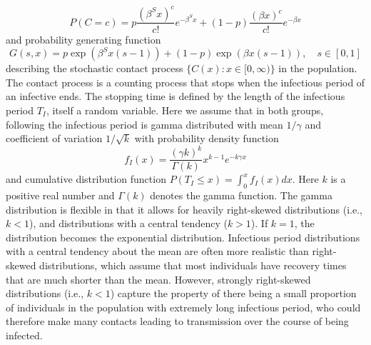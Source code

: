 \documentclass{imammb}
\numberwithin{equation}{section}
\begin{document}
\begin{equation}\label{eqn:contactpmf}
  P(C=c)=  p \frac{(\beta^S x)^c}{c!} e^{-\beta^S x} +(1-p)\frac{(\beta x)^c }{c!} e^{-\beta x}
\end{equation}
and probability generating function
\begin{equation}\label{eqn:contactpgf}
    G(s,x) = p \exp \left ( \beta^S x (s-1) \right)  + (1-p) \exp  \left (\beta x (s-1)\right), \quad s \in [0,1]
\end{equation}
describing the stochastic contact process $\{C(x): x \in [0, \infty)\}$ in the population. The contact process is a counting process that stops when the infectious period of an infective ends. The stopping time is defined by the length of the infectious period $T_I$, itself a random variable. Here we assume that in both groups, following \citet{Anderson, Britton} the infectious period is gamma distributed with mean $1/\gamma$ and coefficient of variation $1/\sqrt{k}$ with probability density function
\begin{equation}\label{eqn:gammapdf}
f_I(x) = \frac{(\gamma k)^k}{\Gamma(k)} x^{k-1}e^{-k \gamma x}
\end{equation}
and cumulative distribution function $P(T_I \leq x) = \int_0^x f_I(x) dx$. Here $k$ is a positive real number and $\Gamma(k)$ denotes the gamma function. The gamma distribution is flexible in that it allows for heavily right-skewed distributions (i.e., $k<1$), and distributions with a central tendency ($k>1$). If $k=1$, the distribution becomes the exponential distribution. Infectious period distributions with a central tendency about the mean are often more realistic \citep{Lloyd2001, Wearing2005, Keeling2008-sh} than right-skewed distributions, which assume that most individuals have recovery times that are much shorter than the mean. However, strongly right-skewed distributions (i.e., $k<1$) capture the property of there being a small proportion of individuals in the population with extremely long infectious period, who could therefore make many contacts leading to transmission over the course of being infected.
\end{document}
